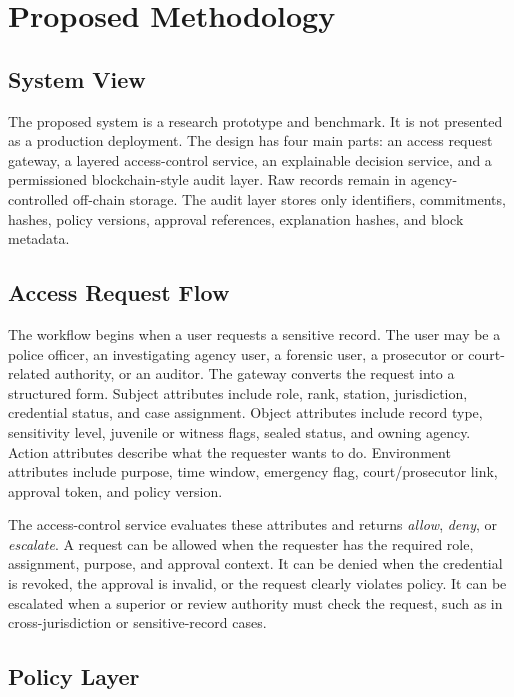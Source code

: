 \section{Proposed Methodology}
\label{sec:methodology}

\subsection{System View}

The proposed system is a research prototype and benchmark. It is not presented
as a production deployment. The design has four main parts: an access request
gateway, a layered access-control service, an explainable decision service, and
a permissioned blockchain-style audit layer. Raw records remain in
agency-controlled off-chain storage. The audit layer stores only identifiers,
commitments, hashes, policy versions, approval references, explanation hashes,
and block metadata.

\subsection{Access Request Flow}

The workflow begins when a user requests a sensitive record. The user may be a
police officer, an investigating agency user, a forensic user, a prosecutor or
court-related authority, or an auditor. The gateway converts the request into a
structured form. Subject attributes include role, rank, station, jurisdiction,
credential status, and case assignment. Object attributes include record type,
sensitivity level, juvenile or witness flags, sealed status, and owning agency.
Action attributes describe what the requester wants to do. Environment
attributes include purpose, time window, emergency flag, court/prosecutor link,
approval token, and policy version.

The access-control service evaluates these attributes and returns
\emph{allow}, \emph{deny}, or \emph{escalate}. A request can be allowed when
the requester has the required role, assignment, purpose, and approval context.
It can be denied when the credential is revoked, the approval is invalid, or
the request clearly violates policy. It can be escalated when a superior or
review authority must check the request, such as in cross-jurisdiction or
sensitive-record cases.

\subsection{Policy Layer}

